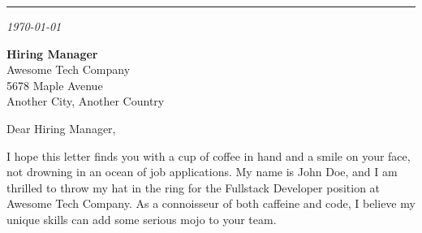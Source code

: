 \newpage

\begin{minipage}[t][\pageheight]{\textwidth}
	\vspace{0pt}

	\noindent{}
	\vspace{0.3em}
	\par\vspace{-1em}\noindent\rule{\linewidth}{0.3mm}\par

    \vspace{5em}
    
    \textit{\today}

    \vspace{1em}

	\textbf{Hiring Manager}\\
	Awesome Tech Company\\
	5678 Maple Avenue\\
	Another City, Another Country\\

    \vspace{3em}

	Dear Hiring Manager,

    \vspace{1em}

	I hope this letter finds you with a cup of coffee in hand and a smile on your face, not drowning in an ocean of job applications. My name is John Doe, and I am thrilled to throw my hat in the ring for the Fullstack Developer position at Awesome Tech Company. As a connoisseur of both caffeine and code, I believe my unique skills can add some serious mojo to your team.

    \vspace{1em}


\end{minipage}
